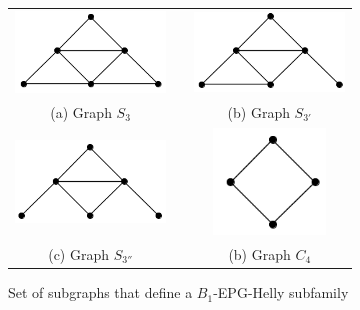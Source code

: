 
\begin{figure}[h]
  \centering
  \begin{tabular}{  c p{0.7cm} c }
    \centering
    \includegraphics[width=4cm]{img/s3.png} & &
    \includegraphics[width=4cm]{img/s3-1.png}
    \\
    \footnotesize \centering 
    (a)  \footnotesize Graph $S_3$ &&  \footnotesize (b) Graph $S_{3'}$ \\
    
      \centering 
      \includegraphics[width=4cm]{img/s3-2.png} & &
    \includegraphics[width=3cm]{img/c4.png}
    \\
    \footnotesize \centering 
    (c)  \footnotesize Graph $S_{3''}$ && \footnotesize (b) Graph $C_{4}$\\
  \end{tabular}

 \caption{Set of subgraphs that define a  $B_1$-EPG-Helly subfamily}
 \label{fig:proibidos}
\end{figure} 
